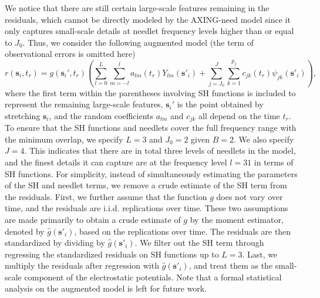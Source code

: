 \documentclass[aoas,preprint]{imsart}
\numberwithin{equation}{section}
\theoremstyle{plain}
\begin{document}
We notice that there are still certain large-scale features remaining in the residuals, which cannot be directly modeled by the AXING-need model since it only captures small-scale details at needlet frequency levels higher than or equal to $J_0$. Thus, we consider the following augmented model (the term of observational errors is omitted here)
$$
r(\mathbf{s}_i, t_r)=g(\mathbf{s}_i', t_r) \left( \sum \limits_{l=0}^L \sum \limits_{m=-l}^l a_{lm}(t_r)Y_{lm}(\textbf{s}'_i) + \sum \limits_{j=J_0}^J \sum \limits_{k=1}^{p_j} c_{jk}(t_r)\psi_{jk}(\textbf{s}'_i) \right),
$$
where the first term within the parentheses involving SH functions is included to represent the remaining large-scale features, $\mathbf{s}_i'$ is the point obtained by stretching $\mathbf{s}_i$, and the random coefficients $a_{lm}$ and $c_{jk}$ all depend on the time $t_r$.
To ensure that the SH functions and needlets cover the full frequency range with the minimum overlap, we specify $L=3$ and $J_0=2$ given $B=2$. We also specify $J=4$. This indicates that there are in total three levels of needlets in the model, and the finest details it can capture are at the frequency level $l=31$ in terms of SH functions.
For simplicity, instead of simultaneously estimating the parameters of the SH and needlet terms, we remove a crude estimate of the SH term from the residuals. First, we further assume that the function $g$ does not vary over time, and the residuals are i.i.d. replications over time. These two assumptions are made primarily to obtain a crude estimate of $g$ by the moment estimator, denoted by $\hat{g}(\mathbf{s}'_i)$, based on the replications over time. The residuals are then standardized by dividing by $\hat{g}(\mathbf{s}'_i)$. We filter out the SH term through regressing the standardized residuals on SH functions up to $L=3$. Last, we multiply the residuals after regression with $\hat{g}(\mathbf{s}'_i)$, and treat them as the small-scale component of the electrostatic potentials. Note that a formal statistical analysis on the augmented model is left for future work.
\end{document}
